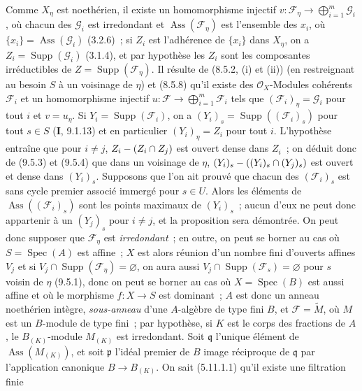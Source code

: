 Comme $X_\eta$ est noethérien, il existe un homomorphisme injectif
$v:\mathcal F_\eta\to\bigoplus_{i=1}^m\mathcal G_i$, où chacun des $\mathcal G_i$ est
irredondant et $\operatorname{Ass}(\mathcal F_\eta)$ est l'ensemble des $x_i$, où
$\{x_i\}=\operatorname{Ass}(\mathcal G_i)$ (3.2.6)~; si $Z_i$ est l'adhérence de
$\{x_i\}$ dans $X_\eta$, on a $Z_i=\operatorname{Supp}(\mathcal G_i)$ (3.1.4), et
par hypothèse les $Z_i$ sont les composantes irréductibles de
$Z=\operatorname{Supp}(\mathcal F_\eta)$. Il résulte de (8.5.2, (i) et (ii)) (en
restreignant au besoin $S$ à un voisinage de $\eta$) et (8.5.8) qu'il existe des
$\mathcal O_X$-Modules cohérents $\mathcal F_i$ et un homomorphisme injectif
$u:\mathcal F\to\bigoplus_{i=1}^m\mathcal F_i$ tels que $(\mathcal F_i)_\eta=\mathcal G_i$ pour
tout $i$ et $v=u_\eta$. Si $Y_i=\operatorname{Supp}(\mathcal F_i)$, on a
$(Y_i)_s=\operatorname{Supp}((\mathcal F_i)_s)$ pour tout $s\in S$
(\textbf{I}, 9.1.13) et en particulier $(Y_i)_\eta=Z_i$ pour tout $i$.
L'hypothèse entraîne que pour $i\neq j$, $Z_i-(Z_i\cap Z_j)$ est ouvert dense
dans $Z_i$~; on déduit donc de (9.5.3) et (9.5.4) que dans un voisinage de
$\eta$, $(Y_i)_s-((Y_i)_s\cap(Y_j)_s)$ est ouvert et dense dans $(Y_i)_s$.
Supposons que l'on ait prouvé que chacun des $(\mathcal F_i)_s$ est sans cycle
premier associé immergé pour $s\in U$. Alors les éléments de
$\operatorname{Ass}((\mathcal F_i)_s)$ sont les points maximaux de $(Y_i)_s$~;
aucun d'eux ne peut donc appartenir à un $(Y_j)_s$ pour $i\neq j$, et la
proposition sera démontrée. On peut donc supposer que $\mathcal F_\eta$ est
\emph{irredondant}~; en outre, on peut se borner au cas où
$S=\operatorname{Spec}(A)$ est affine~; $X$ est alors réunion d'un nombre fini
d'ouverts affines $V_j$ et si $V_j\cap\operatorname{Supp}(\mathcal F_\eta)
=\varnothing$, on aura aussi $V_j\cap\operatorname{Supp}(\mathcal F_s)=\varnothing$
pour $s$ voisin de $\eta$ (9.5.1), donc on peut se borner au cas où
$X=\operatorname{Spec}(B)$ est aussi affine et où le morphisme $f:X\to S$ est
dominant~; $A$ est donc un anneau noethérien intègre, \emph{sous-anneau} d'une
$A$-algèbre de type fini $B$, et $\mathcal F=\widetilde M$, où $M$ est un
$B$-module de type fini~; par hypothèse, si $K$ est le corps des fractions de
$A$, le $B_{(K)}$-module $M_{(K)}$ est irredondant. Soit $\mathfrak q$ l'unique
élément de $\operatorname{Ass}(M_{(K)})$, et soit $\mathfrak p$ l'idéal premier
de $B$ image réciproque de $\mathfrak q$ par l'application canonique
$B\to B_{(K)}$. On sait (5.11.1.1) qu'il existe une filtration finie
